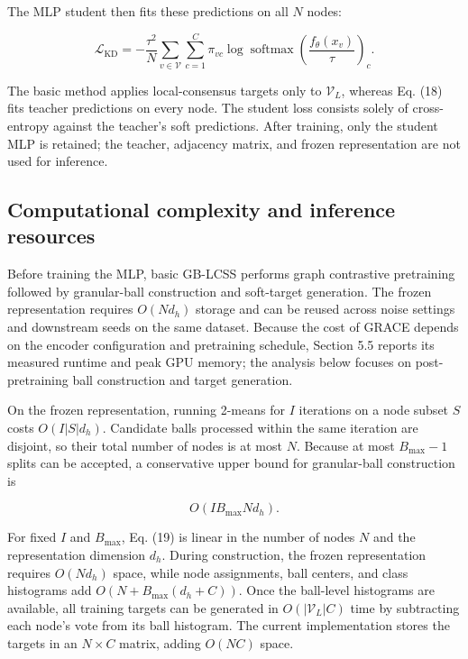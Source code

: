 \documentclass[preprint,12pt]{elsarticle}
\begin{document}
The MLP student then fits these predictions on all \(N\) nodes:

\begin{equation}\label{eq:18}
\mathcal{L}_{\mathrm{KD}} = - \frac{\tau^{2}}{N}\sum_{v \in \mathcal{V}}{\sum_{c = 1}^{C}\pi_{vc}}\log\operatorname{softmax}\left( \frac{f_{\theta}(x_{v})}{\tau} \right)_{c}.
\end{equation}

The basic method applies local-consensus targets only to \(\mathcal{V}_{L}\), whereas Eq. (18) fits teacher predictions on every node. The student loss consists solely of cross-entropy against the teacher's soft predictions. After training, only the student MLP is retained; the teacher, adjacency matrix, and frozen representation are not used for inference.

\subsection{Computational complexity and inference resources}\label{sec:3.6}

Before training the MLP, basic GB-LCSS performs graph contrastive pretraining followed by granular-ball construction and soft-target generation. The frozen representation requires \(O(Nd_{h})\) storage and can be reused across noise settings and downstream seeds on the same dataset. Because the cost of GRACE depends on the encoder configuration and pretraining schedule, Section 5.5 reports its measured runtime and peak GPU memory; the analysis below focuses on post-pretraining ball construction and target generation.

On the frozen representation, running 2-means for \(I\) iterations on a node subset \(S\) costs \(O(I|S|d_{h})\). Candidate balls processed within the same iteration are disjoint, so their total number of nodes is at most \(N\). Because at most \(B_{\max} - 1\) splits can be accepted, a conservative upper bound for granular-ball construction is

\begin{equation}\label{eq:19}
O(IB_{\max}Nd_{h}).
\end{equation}

For fixed \(I\) and \(B_{\max}\), Eq. (19) is linear in the number of nodes \(N\) and the representation dimension \(d_{h}\). During construction, the frozen representation requires \(O(Nd_{h})\) space, while node assignments, ball centers, and class histograms add \(O(N + B_{\max}(d_{h} + C))\). Once the ball-level histograms are available, all training targets can be generated in \(O(|\mathcal{V}_{L}|C)\) time by subtracting each node's vote from its ball histogram. The current implementation stores the targets in an \(N \times C\) matrix, adding \(O(NC)\) space.
\end{document}
